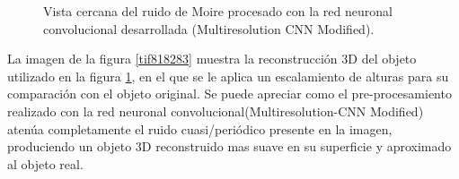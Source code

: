 \documentclass[10pt,letterpaper]{article}
\begin{document}
\begin{figure}[H]
      \begin{center}
        \caption{Vista cercana del ruido de Moire procesado con la red neuronal convolucional desarrollada (Multiresolution CNN Modified).}
        \label{tif7980}
      \end{center}
    \end{figure}

La imagen de la figura \ref{tif818283} muestra la reconstrucción 3D del objeto utilizado en la figura \ref{tif7980}, en el que se le aplica un escalamiento de alturas para su comparación con el objeto original\cite{Alfa:Mont}. Se puede apreciar como el pre-procesamiento realizado con la red neuronal convolucional(Multiresolution-CNN Modified) atenúa completamente el ruido cuasi/periódico presente en la imagen, produciendo un objeto 3D reconstruido mas suave en su superficie y aproximado al objeto real.
\end{document}
